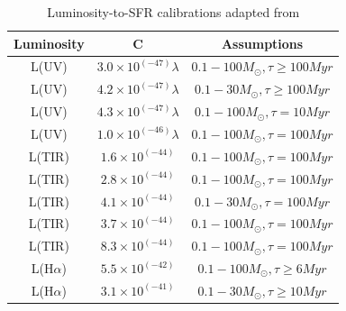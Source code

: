 \begin{table}[ht]
\caption{Luminosity-to-SFR calibrations adapted from \cite{Calzetti13}\label{table1}}
\centering
\begin{tabular}{ c c c }
\hline\hline
Luminosity\footnotemark{} & C\footnotemark{} & Assumptions\footnotemark{}\\
\hline
L(UV) & $3.0 \times 10^{(-47)} \lambda$ &$0.1 -100 M_{\odot}, \tau \ge 100 Myr $\\
L(UV) & $4.2 \times 10^{(-47)} \lambda$ &$0.1 -30 M_{\odot}, \tau \ge 100 Myr $\\
L(UV) & $4.3 \times 10^{(-47)}\lambda$ &$0.1 -100 M_{\odot}, \tau = 10 Myr $\\
L(UV) & $1.0 \times 10^{(-46)}\lambda$ &$0.1 -100 M_{\odot}, \tau = 100 Myr $\\
L(TIR) & $1.6 \times 10^{(-44)}$ &$0.1 -100 M_{\odot}, \tau = 100 Myr $\\
L(TIR) & $2.8 \times 10^{(-44)}$ &$0.1 -100 M_{\odot}, \tau = 100 Myr $\\
L(TIR) & $4.1 \times 10^{(-44)}$ &$0.1 -30 M_{\odot}, \tau = 100 Myr $\\
L(TIR) & $3.7 \times 10^{(-44)}$ &$0.1 -100 M_{\odot}, \tau = 100 Myr $\\
L(TIR) & $8.3 \times 10^{(-44)}$ &$0.1 -100 M_{\odot}, \tau = 100 Myr $\\
L(H${\alpha}$) & $5.5 \times 10^{(-42)}$&$0.1 -100 M_{\odot},  \tau \ge 6 Myr $\\
L(H${\alpha}$) & $3.1 \times 10^{(-41)}$&$0.1 -30 M_{\odot},  \tau \ge 10 Myr $\\
\hline
\end{tabular}
\end{table}


